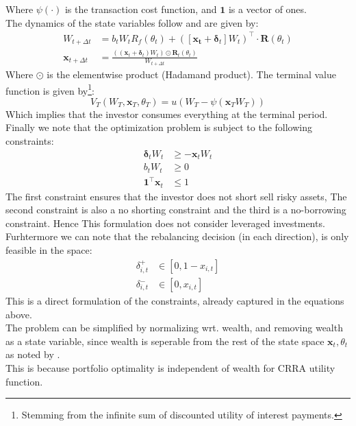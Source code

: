 \documentclass[11pt]{article}
\begin{document}
Where $\psi(\cdot )$ is the transaction cost function, and $\mathbf{1}$ is a vector of ones.\\
The dynamics of the state variables follow \textcite{Schober2022} and are given by:
\begin{align}
  W_{t+\Delta t} &= b_t W_t R_f (\theta_t) +  ( [ \mathbf{x_t} + \boldsymbol{\delta}_t ] W_t )^{\top} \cdot \mathbf{R}(\theta_t) \\
  \mathbf{x}_{t+\Delta t} &=  \frac{( (\mathbf{x}_t + \boldsymbol{\delta}_t ) W_t ) \odot \mathbf{R}_t (\theta_t )}{ W_{t+\Delta t} }
\end{align}
Where $\odot$ is the elementwise product (Hadamand product). The terminal value function is
given by\footnote{Stemming from the infinite sum of discounted utility of interest payments.}:
\begin{equation} \label{eq: class_terminal_value_non_normalized}
  V_T (W_T , \mathbf{x}_T , \theta_T ) = u ( W_T - \psi ( \mathbf{x}_T W_T ))
\end{equation}
Which implies that the investor consumes everything at the terminal period.
Finally we note that the optimization problem is subject to the following constraints:
\begin{align}
  \boldsymbol{\delta}_t W_t &\geq - \mathbf{x}_t W_t \\
  b_t W_t &\geq 0 \\
  \mathbf{1}^{\top} \mathbf{x}_t &\leq 1
\end{align}
The first constraint ensures that the investor does not short sell risky assets, 
The second constraint is also a no shorting constraint
and the third is a no-borrowing constraint. Hence This formulation does not consider leveraged investments.\\
Furhtermore we can note that the rebalancing decision (in each direction), is only feasible in the space:
\begin{align}
  \delta^{+}_{i,t} &\in [0 , 1-x_{i,t}]  \label{eq: delta+_space} \\
  \delta^{-}_{i,t} &\in [0 , x_{i,t}] \label{eq: delta-_space}
\end{align}
This is a direct formulation of the constraints, already captured in the equations above.\\
The problem can be simplified by normalizing wrt. wealth, and removing wealth as a state variable, since
wealth is seperable from the rest of the state space $\mathbf{x}_t , \theta_t$ as noted by \textcite{CaiJuddXu2013}.\\
This is because portfolio optimality is independent of wealth for CRRA utility function. 
\end{document}
